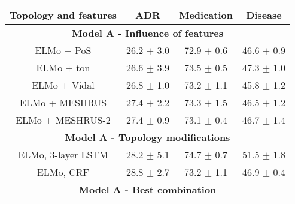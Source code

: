 \begin{tabular}{|c|c|c|c|}
\hline
\textbf{\textbf{Topology and features}}                                                                & \textbf{\textbf{ADR}}               & \textbf{\textbf{Medication}} & \textbf{\textbf{Disease}} \\ \hline
\multicolumn{4}{|c|}{\textbf{Model A - Influence of features}}                                                                                                                                                                  \\ \hline
ELMo + PoS                                                                                             & 26.2 $\pm$ 3.0                      & 72.9 $\pm$ 0.6               & 46.6 $\pm$ 0.9            \\ \hline
ELMo + ton                                                                                             & 26.6 $\pm$ 3.9                      & 73.5 $\pm$ 0.5               & 47.3 $\pm$ 1.0            \\ \hline
ELMo + Vidal                                                                                           & 26.8 $\pm$ 1.0                      & 73.2 $\pm$ 1.1               & 45.8 $\pm$ 1.2            \\ \hline
ELMo + MESHRUS                                                                                         & 27.4 $\pm$ 2.2                      & 73.3 $\pm$ 1.5               & 46.5 $\pm$ 1.2            \\ \hline
ELMo + MESHRUS-2                                                                                       & 27.4 $\pm$ 0.9                      & 73.1 $\pm$ 0.4               & 46.7 $\pm$ 1.4            \\ \hline
\multicolumn{4}{|c|}{\textbf{Model A - Topology modifications}}                                                                                                                                         \\ \hline
ELMo, 3-layer LSTM                                                                                     & 28.2 $\pm$ 5.1                      & 74.7 $\pm$ 0.7               & 51.5 $\pm$ 1.8            \\ \hline
ELMo, CRF                                                                                              & 28.8 $\pm$ 2.7                      & 73.2 $\pm$ 1.1               & 46.9 $\pm$ 0.4            \\ \hline
\multicolumn{4}{|c|}{\textbf{Model A - Best combination}}                                                                                                                                               \\ \hline

\end{tabular}
